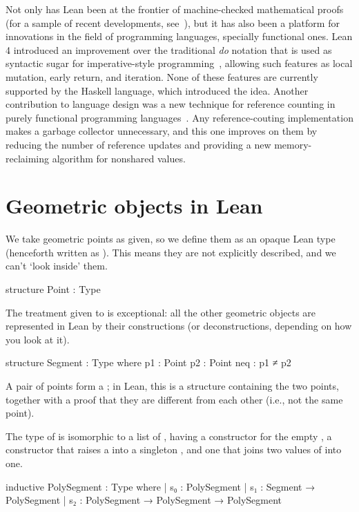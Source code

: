\documentclass[12pt]{article} %
\begin{document}
{Not only has Lean been at the frontier of machine-checked mathematical proofs (for a sample of recent developments, see~\cite{bhavik2023sharkovsky,defrutosfernandez2022adeles,dillies2022Szmeredi,baanen2023mordell,clune2023keller,doorn2023hprinciple}), but it has also been a platform for innovations in the field of programming languages, specially functional ones. %
Lean 4 introduced an improvement over the traditional \textit{do} notation that is used as syntactic sugar for imperative-style programming~\cite{ullrich2022doUnchained}, allowing such features as local mutation, early return, and iteration. %
None of these features are currently supported by the Haskell language, which introduced the idea. %
Another contribution to language design was a new technique for reference counting in purely functional programming languages~\cite{Ullrich2019counting}. %
Any reference-couting implementation makes a garbage collector unnecessary, and this one improves on them by reducing the number of reference updates and providing a new memory-reclaiming algorithm for nonshared values. %

\section{Geometric objects in Lean}\label{sec:geom-objects-lean} %

We take geometric points as given, so we define them as an opaque Lean type (henceforth written as \point). %
This means they are not explicitly described, and we can't ‘look inside’ them. %
\begin{leancode}
structure Point : Type
\end{leancode}

The treatment given to \point{} is exceptional: all the other geometric objects are represented in Lean by their constructions (or deconstructions, depending on how you look at it). %

\begin{leancode}
structure Segment : Type where
  p1 : Point
  p2 : Point
  neq : p1 ≠ p2
\end{leancode}

A pair of points form a \segment; in Lean, this is a structure
containing the two points, together with a proof that they are
different from each other (i.e., not the same point). %

The type of \psegment{} is isomorphic to a list of \segment, having a constructor for the empty \psegment, a constructor that raises a \segment{} into a singleton \psegment, and one that joins two values of \psegment{} into one. %
\begin{leancode}
inductive PolySegment : Type where
| s₀ : PolySegment
| s₁ : Segment → PolySegment
| s₂ : PolySegment → PolySegment → PolySegment


\end{leancode}}
\end{document}
